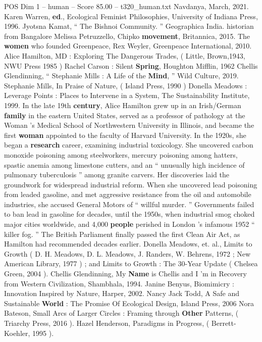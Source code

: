 \begin{textsample}{POS Dim 1 – human – Score 85.00 – t320\_human.txt}
Navdanya, March, 2021.
Karen Warren, \textbf{ed}., Ecological Feminist Philosophies, University of Indiana Press, 1996.
Jyotsna Kamat, “ The Bishnoi Community. ” Geographica India. historian from Bangalore Melissa Petruzzello, Chipko \textbf{movement}, Britannica, 2015.
The \textbf{women} who founded Greenpeace, Rex Weyler, Greenpeace International, 2010.
Alice Hamilton, MD : Exploring The Dangerous Trades, ( Little, Brown,1943, NWU Press 1985 ) Rachel Carson : Silent \textbf{Spring}, Houghton Mifflin, 1962 Chellis Glendinning, “ Stephanie Mills : A Life of the \textbf{Mind}, ” Wild Culture, 2019.
Stephanie Mills, In Praise of Nature, ( Island Press, 1990 ) Donella Meadows : Leverage Points : Places to Intervene in a System, The Sustainability Institute, 1999.
In the late 19th \textbf{century}, Alice Hamilton grew up in an Irish/German \textbf{family} in the eastern United States, served as a professor of pathology at the Woman ’s Medical School of Northwestern University in Illinois, and became the first \textbf{woman} appointed to the faculty of Harvard University.
In the 1920s, she began a \textbf{research} career, examining industrial toxicology.
She uncovered carbon monoxide poisoning among steelworkers, mercury poisoning among hatters, spastic anemia among limestone cutters, and an “ unusually high incidence of pulmonary tuberculosis ” among granite carvers.
Her discoveries laid the groundwork for widespread industrial reform.
When she uncovered lead poisoning from leaded gasoline, and met aggressive resistance from the oil and automobile industries, she accused General Motors of “ willful murder. ” Governments failed to ban lead in gasoline for decades, until the 1950s, when industrial smog choked major cities worldwide, and 4,000 \textbf{people} perished in London ’s infamous 1952 “ killer fog. ” The British Parliament finally passed the first Clean Air Act, as Hamilton had recommended decades earlier.
Donella Meadows, et. al., Limits to Growth ( D.
H.
Meadows, D.
L.
Meadows, J.
Randers, W.
Behrens, 1972 ; New American Library, 1977 ) ; and Limits to Growth : The 30-Year Update ( Chelsea Green, 2004 ).
Chellis Glendinning, My \textbf{Name} is Chellis and I ’m in Recovery from Western Civilization, Shambhala, 1994.
Janine Benyus, Biomimicry : Innovation Inspired by Nature, Harper, 2002.
Nancy Jack Todd, A Safe and Sustainable \textbf{World} : The Promise Of Ecological Design, Island Press, 2006 Nora Bateson, Small Arcs of Larger Circles : Framing through \textbf{Other} Patterns, ( Triarchy Press, 2016 ).
Hazel Henderson, Paradigms in Progress, ( Berrett-Koehler, 1995 ).

\end{textsample}
